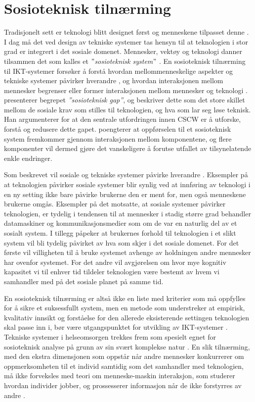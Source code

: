 \section{Sosioteknisk tilnærming}
\label{section:sosioteknisk}
Tradisjonelt sett er teknologi blitt designet først og menneskene tilpasset denne \citep{Appelbaum97}. I dag må det ved design av tekniske systemer tas hensyn til at teknologien i stor grad er integrert i det sosiale domenet. Mennesker, vektøy og teknologi danner tilsammen det som kalles et \textit{$"$sosioteknisk system$"$} \citep{Coiera04}. En sosioteknisk tilnærming til IKT-systemer forsøker å forstå hvordan mellommenneskelige aspekter og tekniske systemer påvirker hverandre \citep{Coiera04}, og hvordan interaksjonen mellom mennesker begrenser eller former interaksjonen mellom mennesker og teknologi \citep{Coiera07}. \citet{Ackerman00} presenterer begrepet \textit{”sosioteknisk gap”}, og beskriver dette som det store skillet mellom de sosiale krav som stilles til teknologien, og hva som lar seg løse teknisk. Han argumenterer for at den sentrale utfordringen innen CSCW er å utforske, forstå og redusere dette gapet. \citet{Coiera04} poengterer at oppførselen til et sosioteknisk system fremkommer gjennom interaksjonen mellom komponentene, og flere komponenter vil dermed gjøre det vanskeligere å forutse utfallet av tilsynelatende enkle endringer. 

\noindent
Som beskrevet vil sosiale og tekniske systemer påvirke hverandre \citep{Coiera04}. Eksempler på at teknologien påvirker sosiale systemer blir synlig ved at innføring av teknologi i en ny setting ikke bare påvirke brukerne den er ment for, men også menneskene brukerne omgås. Eksempler på det motsatte, at sosiale systemer påvirker teknologien, er tydelig i tendensen til at mennesker i stadig større grad behandler datamaskiner og kommunikasjonsmedier som om de var en naturlig del av et sosialt system. I tillegg påpeker \citet{Coiera07} at brukernes forhold til teknologien i et slikt system vil bli tydelig påvirket av hva som skjer i det sosiale domenet. For det første vil villigheten til å bruke systemet avhenge av holdningen andre mennesker har ovenfor systemet. For det andre vil avgjørelsen om hvor mye kognitiv kapasitet vi til enhver tid tildeler teknologien være bestemt av hvem vi samhandler med på det sosiale planet på samme tid.

\noindent
En sosioteknisk tilnærming er altså ikke en liste med kriterier som må oppfylles for å sikre et suksessfullt system, men en metode som understreker at empirisk, kvalitativ innsikt og forståelse for den allerede eksisterende settingen teknologien skal passe inn i, bør være utgangspunktet for utvikling av IKT-systemer \citep{Berg99}. Tekniske systemer i helseomsorgen trekkes frem som spesielt egnet for sosioteknisk analyse på grunn av sin svært komplekse natur \citep{Coiera07, Berg99}. En slik tilnærming, med den ekstra dimensjonen som oppstår når andre mennesker konkurrerer om oppmerksomheten til et individ samtidig som det samhandler med teknologien, må ikke forveksles med teori om menneske-maskin interaksjon, som studerer hvordan individer jobber, og prossesserer informasjon når de ikke forstyrres av andre \citep{Coiera07}.
